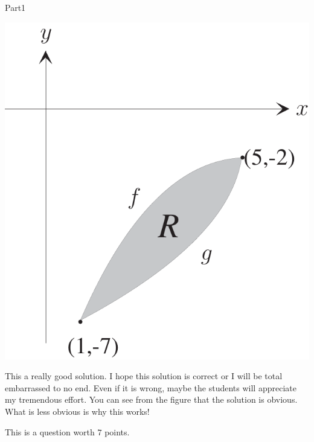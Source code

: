 \documentclass[12pt]{article}
\begin{document}
\begin{exam}[Part I.]{Part1}
\begin{problem}[5]
\begin{splitsolution}
\begin{panel}\relax
\includegraphics[scale=.2]{fig1}
\end{panel}
\begin{solution}[1in]
This a really good  solution. I hope this solution is correct or I will be total
embarrassed to no end. Even if it is wrong, maybe the students will appreciate
my tremendous effort. You can see from the figure that the solution is obvious.
What is less obvious is why this works!
\end{solution}
\end{splitsolution}
\end{problem}


\begin{problem}[7]
This is a question worth $7$ points.


\end{problem}
\end{exam}
\end{document}
